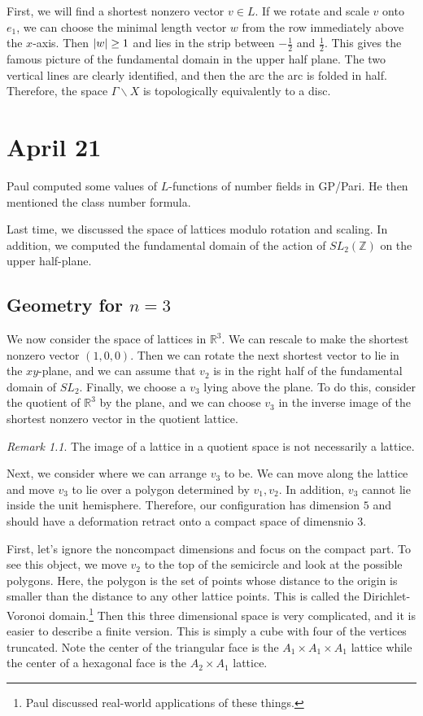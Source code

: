 \documentclass[leqno, openany]{memoir}
\theoremstyle{definition}
\theoremstyle{remark}
\newtheorem{rmk}[thm]{Remark}
\theoremstyle{plain}
\theoremstyle{definition}
\theoremstyle{remark}
\newcommand{\R}{\mathbb{R}}
\newcommand{\Z}{\mathbb{Z}}
\begin{document}
First, we will find a shortest nonzero vector $v \in L$. If we rotate and scale $v$ onto $e_1$, we can choose the minimal length vector $w$ from the row immediately above the $x$-axis. Then $\abs{w} \geq 1$ and lies in the strip between $-\frac{1}{2}$ and $\frac{1}{2}$. This gives the famous picture of the fundamental domain in the upper half plane. The two vertical lines are clearly identified, and then the arc the arc is folded in half. Therefore, the space $\Gamma \backslash X$ is topologically equivalently to a disc.


\chapter{April 21}%
\label{cha:april_21}

Paul computed some values of $L$-functions of number fields in GP/Pari. He then mentioned the class number formula.

Last time, we discussed the space of lattices modulo rotation and scaling. In addition, we computed the fundamental domain of the action of $SL_2(\Z)$ on the upper half-plane.

\section{Geometry for $n=3$}%
\label{sec:geometry_for_n_3_}


We now consider the space of lattices in $\R^3$. We can rescale to make the shortest nonzero vector $(1,0,0)$. Then we can rotate the next shortest vector to lie in the $xy$-plane, and we can assume that $v_2$ is in the right half of the fundamental domain of $SL_2$. Finally, we choose a $v_3$ lying above the plane. To do this, consider the quotient of $\R^3$ by the plane, and we can choose $v_3$ in the inverse image of the shortest nonzero vector in the quotient lattice.

\begin{rmk}
    The image of a lattice in a quotient space is not necessarily a lattice.
\end{rmk}

Next, we consider where we can arrange $v_3$ to be. We can move along the lattice and move $v_3$ to lie over a polygon determined by $v_1,v_2$. In addition, $v_3$ cannot lie inside the unit hemisphere. Therefore, our configuration has dimension $5$ and should have a deformation retract onto a compact space of dimensnio $3$.

First, let's ignore the noncompact dimensions and focus on the compact part. To see this object, we move $v_2$ to the top of the semicircle and look at the possible polygons. Here, the polygon is the set of points whose distance to the origin is smaller than the distance to any other lattice points. This is called the Dirichlet-Voronoi domain.\footnote{Paul discussed real-world applications of these things.} Then this three dimensional space is very complicated, and it is easier to describe a finite version. This is simply a cube with four of the vertices truncated. Note the center of the triangular face is the $A_1 \times A_1 \times A_1$ lattice while the center of a hexagonal face is the $A_2 \times A_1$ lattice.
\end{document}
